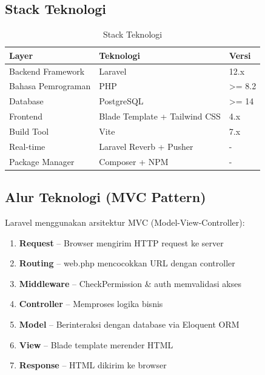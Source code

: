 \documentclass[12pt,a4paper]{article}
\begin{document}
\subsection{Stack Teknologi}
\begin{table}[h]
\centering
\begin{tabular}{|l|l|l|}
\hline
\textbf{Layer} & \textbf{Teknologi} & \textbf{Versi} \\
\hline
Backend Framework & Laravel & 12.x \\
Bahasa Pemrograman & PHP & >= 8.2 \\
Database & PostgreSQL & >= 14 \\
Frontend & Blade Template + Tailwind CSS & 4.x \\
Build Tool & Vite & 7.x \\
Real-time & Laravel Reverb + Pusher & - \\
Package Manager & Composer + NPM & - \\
\hline
\end{tabular}
\caption{Stack Teknologi}
\end{table}

\subsection{Alur Teknologi (MVC Pattern)}
Laravel menggunakan arsitektur MVC (Model-View-Controller):

\begin{enumerate}
    \item \textbf{Request} -- Browser mengirim HTTP request ke server
    \item \textbf{Routing} -- web.php mencocokkan URL dengan controller
    \item \textbf{Middleware} -- CheckPermission \& auth memvalidasi akses
    \item \textbf{Controller} -- Memproses logika bisnis
    \item \textbf{Model} -- Berinteraksi dengan database via Eloquent ORM
    \item \textbf{View} -- Blade template merender HTML
    \item \textbf{Response} -- HTML dikirim ke browser
\end{enumerate}
\end{document}
